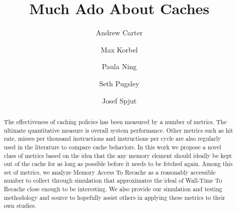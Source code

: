 \documentclass[conference]{IEEEtran}
\begin{document}
\title{Much Ado About Caches}


\author{Andrew Carter \and Max Korbel \and Paula Ning \and Seth Pugsley \and Josef Spjut}

\maketitle

\begin{abstract}
The effectiveness of caching policies has been measured by a number of metrics. 
The ultimate quantitative measure is overall system performance.
Other metrics such as hit rate, misses per thousand instructions and
instructions per cycle are also regularly used in the literature to
compare cache behaviors.
In this work we propose a novel class of metrics based on the idea
that the any memory element should ideally be kept out of the cache
for as long as possible before it needs to be fetched again.
Among this set of metrics, we analyze Memory Access To Recache as a
reasonably accessible number to collect through simulation that
approximates the ideal of Wall-Time To Recache close enough to be
interesting.
We also provide our simulation and testing methodology and source to
hopefully assist others in applying these metrics to their own
studies.
\end{abstract}









%
%
\end{document}
